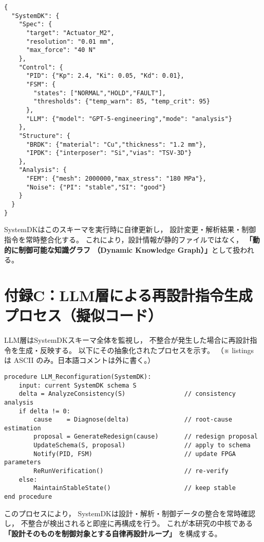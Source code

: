 \lstset{
  style=ieee-tight,         %
  language=json
}
\vspace{0.25\baselineskip}  %
\begin{lstlisting}[caption={SystemDK schema example},label={lst:sdk_schema}]
{
  "SystemDK": {
    "Spec": {
      "target": "Actuator_M2",
      "resolution": "0.01 mm",
      "max_force": "40 N"
    },
    "Control": {
      "PID": {"Kp": 2.4, "Ki": 0.05, "Kd": 0.01},
      "FSM": {
        "states": ["NORMAL","HOLD","FAULT"],
        "thresholds": {"temp_warn": 85, "temp_crit": 95}
      },
      "LLM": {"model": "GPT-5-engineering","mode": "analysis"}
    },
    "Structure": {
      "BRDK": {"material": "Cu","thickness": "1.2 mm"},
      "IPDK": {"interposer": "Si","vias": "TSV-3D"}
    },
    "Analysis": {
      "FEM": {"mesh": 2000000,"max_stress": "180 MPa"},
      "Noise": {"PI": "stable","SI": "good"}
    }
  }
}
\end{lstlisting}

SystemDKはこのスキーマを実行時に自律更新し，
設計変更・解析結果・制御指令を常時整合化する。
これにより，設計情報が静的ファイルではなく，
\textbf{「動的に制御可能な知識グラフ
（Dynamic Knowledge Graph）」}として扱われる。

\section*{付録C：LLM層による再設計指令生成プロセス（擬似コード）}

LLM層はSystemDKスキーマ全体を監視し，
不整合が発生した場合に再設計指令を生成・反映する。
以下にその抽象化されたプロセスを示す。
（※ listings は ASCII のみ。日本語コメントは外に書く。）

\vspace{0.25\baselineskip}
\begin{lstlisting}[caption={LLM-driven redesign procedure},label={lst:llm_proc}]
procedure LLM_Reconfiguration(SystemDK):
    input: current SystemDK schema S
    delta = AnalyzeConsistency(S)                // consistency analysis
    if delta != 0:
        cause    = Diagnose(delta)               // root-cause estimation
        proposal = GenerateRedesign(cause)       // redesign proposal
        UpdateSchema(S, proposal)                // apply to schema
        Notify(PID, FSM)                         // update FPGA parameters
        ReRunVerification()                      // re-verify
    else:
        MaintainStableState()                    // keep stable
end procedure
\end{lstlisting}

このプロセスにより，
SystemDKは設計・解析・制御データの整合を常時確認し，
不整合が検出されると即座に再構成を行う。
これが本研究の中核である
\textbf{「設計そのものを制御対象とする自律再設計ループ」}
を構成する。
